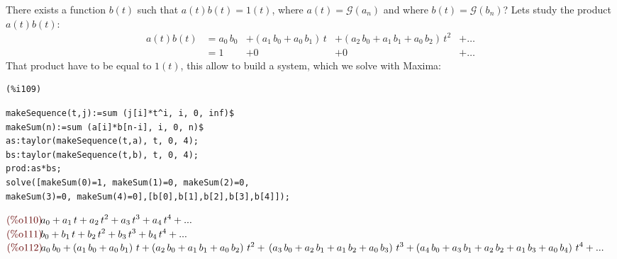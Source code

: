 There exists a function $b(t)$ such that $a(t)b(t)=1(t)$, where $a(t)
= \mathcal{G} (a_n)$ and where $b(t) = \mathcal{G} (b_n)$? Lets study
the product $a(t)b(t)$:
\begin{displaymath}
  \begin{split}
    a(t)b(t) &= {a}_{0}\,{b}_{0}&+\left(
      {a}_{1}\,{b}_{0}+{a}_{0}\,{b}_{1}\right) \,t&+\left(
      {a}_{2}\,{b}_{0}+{a}_{1}\,{b}_{1}+{a}_{0}\,{b}_{2}\right)
    \,{t}^{2}&+ \ldots\\
    &= 1 &+ 0 &+ 0 &+ \ldots
  \end{split}
\end{displaymath}
That product have to be equal to $1(t)$, this allow to build a system,
which we solve with Maxima:\\
\noindent
\begin{minipage}[t]{8ex}{\color{red}\bf
\begin{verbatim}
(%i109) 
\end{verbatim}}
\end{minipage}
\begin{minipage}[t]{\textwidth}{\color{blue}
\begin{verbatim}
makeSequence(t,j):=sum (j[i]*t^i, i, 0, inf)$
makeSum(n):=sum (a[i]*b[n-i], i, 0, n)$
as:taylor(makeSequence(t,a), t, 0, 4);
bs:taylor(makeSequence(t,b), t, 0, 4);
prod:as*bs;
solve([makeSum(0)=1, makeSum(1)=0, makeSum(2)=0,
makeSum(3)=0, makeSum(4)=0],[b[0],b[1],b[2],b[3],b[4]]);
\end{verbatim}}
\end{minipage}
\begin{math}\displaystyle
\parbox{8ex}{\color{labelcolor}(\%o110) }
{a}_{0}+{a}_{1}\,t+{a}_{2}\,{t}^{2}+{a}_{3}\,{t}^{3}+{a}_{4}\,{t}^{4}+...
\end{math}\\
\begin{math}\displaystyle
\parbox{8ex}{\color{labelcolor}(\%o111) }
{b}_{0}+{b}_{1}\,t+{b}_{2}\,{t}^{2}+{b}_{3}\,{t}^{3}+{b}_{4}\,{t}^{4}+...
\end{math}\\
\begin{math}\displaystyle
\parbox{8ex}{\color{labelcolor}(\%o112) }
{a}_{0}\,{b}_{0}+\left( {a}_{1}\,{b}_{0}+{a}_{0}\,{b}_{1}\right)
\,t+\left( {a}_{2}\,{b}_{0}+{a}_{1}\,{b}_{1}+{a}_{0}\,{b}_{2}\right)
\,{t}^{2}+\\
\left( {a}_{3}\,{b}_{0}+{a}_{2}\,{b}_{1}+{a}_{1}\,{b}_{2}+{a}_{0}\,{b}_{3}\right) \,{t}^{3}+\left( {a}_{4}\,{b}_{0}+{a}_{3}\,{b}_{1}+{a}_{2}\,{b}_{2}+{a}_{1}\,{b}_{3}+{a}_{0}\,{b}_{4}\right) \,{t}^{4}+...
\end{math}\\

